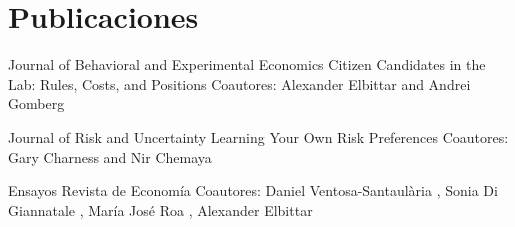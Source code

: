 
\section{Publicaciones}

{Journal of Behavioral and Experimental Economics}
{Citizen Candidates in the Lab: Rules, Costs, and Positions}
{}{}
{Coautores: Alexander Elbittar and Andrei Gomberg}

{Journal of Risk and Uncertainty}
{Learning Your Own Risk Preferences}
{}{}
{Coautores: Gary Charness and Nir Chemaya}


{Ensayos Revista de Economía}
{
}
{}{}
{Coautores: Daniel Ventosa-Santaulària
	, Sonia Di Giannatale
	, María José Roa
	, Alexander Elbittar
}


